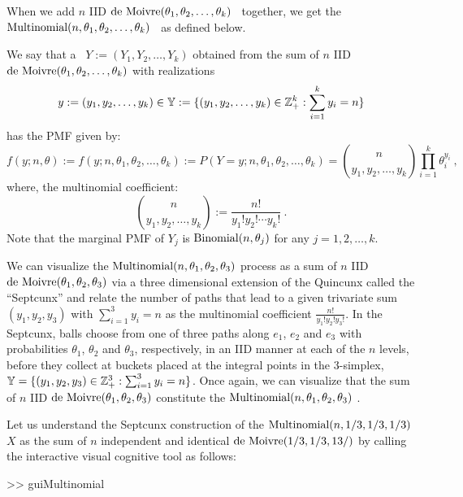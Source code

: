 When we add $n$ IID $\mbox{{\rm de~Moivre}}(\theta_1,\theta_2,\ldots,\theta_k)$ \rv~together, we get the $\mbox{{\rm Multinomial}}(n,\theta_1,\theta_2,\ldots,\theta_k)$ \rv~as defined below.

\begin{model}\label{M:Multinomial}
We say that a \rv~$Y:=(Y_1,Y_2,\ldots,Y_k)$ obtained from the sum of $n$ IID $\mbox{{\rm de~Moivre}}(\theta_1,\theta_2,\ldots,\theta_k)$  with realizations
$$y:=(y_1,y_2,\ldots,y_k) \in \mathbb{Y}:= \{(y_1,y_2,\ldots,y_k) \in \mathbb{Z}_+^k : \sum_{i=1}^k y_i = n\}$$ has the PMF given by:
\[
f(y;n,\theta) := f(y;n,\theta_1,\theta_2,\ldots,\theta_k) := P(Y=y;n,\theta_1,\theta_2,\ldots,\theta_k) = \binom{n}{y_1,y_2,\ldots,y_k} \prod_{i=1}^k \theta_i^{y_i} \ ,
\]
where, the multinomial coefficient:
\[
 \binom{n}{y_1,y_2,\ldots,y_k} := \frac{n!}{y_1! y_2! \cdots y_k!} \ .
\]
Note that the marginal PMF of $Y_j$ is $\mbox{{\rm Binomial}}(n,\theta_j)$ for any $j=1,2,\ldots,k$.
\end{model}

We can visualize the $\mbox{{\rm Multinomial}}(n,\theta_1,\theta_2,\theta_3)$ process as a sum of $n$ IID $\mbox{{\rm de~Moivre}}(\theta_1,\theta_2,\theta_3)$  via a three dimensional extension of the Quincunx called the ``Septcunx'' and relate the number of paths that lead to a given trivariate sum $(y_1,y_2,y_3)$ with $\sum_{i=1}^3 y_i = n$ as the multinomial coefficient $\frac{n!}{y_1! y_2! y_3!}$.  In the Septcunx, balls choose from one of three paths along $e_1$, $e_2$ and $e_3$ with probabilities $\theta_1$, $\theta_2$ and $\theta_3$, respectively, in an IID manner at each of the $n$ levels, before they collect at buckets placed at the integral points in the $3$-simplex, $\mathbb{Y} = \{(y_1,y_2,y_3) \in \mathbb{Z}_+^3 : \sum_{i=1}^3 y_i=n \}$.  Once again, we can visualize that the sum of $n$ IID $\mbox{{\rm de~Moivre}}(\theta_1,\theta_2,\theta_3)$  constitute the $\mbox{{\rm Multinomial}}(n,\theta_1,\theta_2,\theta_3)$ \rv.%

\begin{labwork}\label{LW:SeptcunxSampler}
{\rm
Let us understand the Septcunx construction of the $\mbox{{\rm Multinomial}}(n,1/3,1/3,1/3)$ \rv $X$ as the sum of $n$ independent and identical $\mbox{{\rm de~Moivre}}(1/3,1/3,13/)$  by calling the interactive visual cognitive tool as follows:
\begin{VrbM}
>> guiMultinomial
\end{VrbM}
}
\end{labwork}

